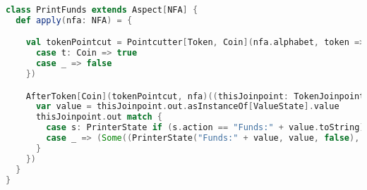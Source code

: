 \begin{lstlisting}[language = Scala]
class PrintFunds extends Aspect[NFA] {
  def apply(nfa: NFA) = {

    val tokenPointcut = Pointcutter[Token, Coin](nfa.alphabet, token => token match {
      case t: Coin => true
      case _ => false
    })

    AfterToken[Coin](tokenPointcut, nfa)((thisJoinpoint: TokenJoinpoint[Coin], thisNFA: NFA) => {
      var value = thisJoinpoint.out.asInstanceOf[ValueState].value
      thisJoinpoint.out match {
        case s: PrinterState if (s.action == "Funds:" + value.toString) => (None, thisNFA)
        case _ => (Some((PrinterState("Funds:" + value, value, false), Lambda)), thisNFA)
      }
    })
  }
}
\end{lstlisting}